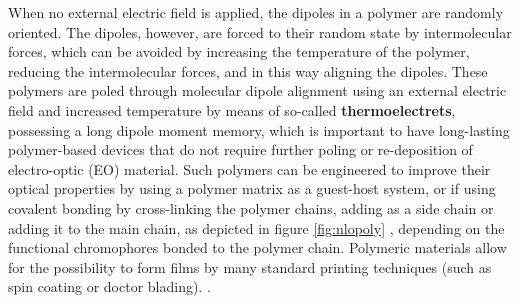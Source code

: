 When no external electric field is applied, the dipoles in a polymer are randomly oriented. The dipoles, however, are forced to their random state by intermolecular forces, which can be avoided by increasing the temperature of the polymer, reducing the intermolecular forces, and in this way aligning the dipoles. These polymers are poled through molecular dipole alignment using an external electric field and increased temperature by means of so-called \textbf{thermoelectrets}, possessing a long dipole moment memory, which is important to have long-lasting polymer-based devices that do not require further poling or re-deposition of electro-optic (EO) material. Such polymers can be engineered to improve their optical properties by using a polymer matrix as a guest-host system, or if using covalent bonding by cross-linking the polymer chains, adding as a side chain or adding it to the main chain, as depicted in figure \ref{fig:nlopoly} \cite{GuenterNLO12}, depending on the functional chromophores bonded to the polymer chain. Polymeric materials allow for the possibility to form films by many standard printing techniques (such as spin coating or doctor blading). \cite{BosshardOrgaNLO95}.

